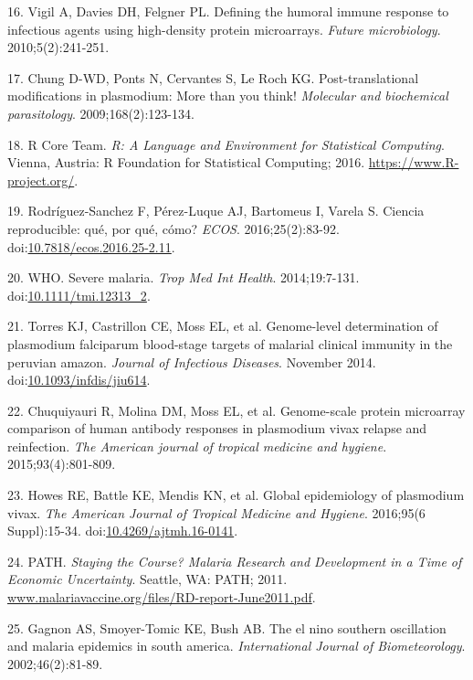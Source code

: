 \documentclass[]{article}
\begin{document}
\hypertarget{ref-vigil2010}{}
16. Vigil A, Davies DH, Felgner PL. Defining the humoral immune response
to infectious agents using high-density protein microarrays.
\emph{Future microbiology}. 2010;5(2):241-251.

\hypertarget{ref-leroch2009postmod}{}
17. Chung D-WD, Ponts N, Cervantes S, Le Roch KG. Post-translational
modifications in plasmodium: More than you think! \emph{Molecular and
biochemical parasitology}. 2009;168(2):123-134.

\hypertarget{ref-R}{}
18. R Core Team. \emph{R: A Language and Environment for Statistical
Computing}. Vienna, Austria: R Foundation for Statistical Computing;
2016. \url{https://www.R-project.org/}.

\hypertarget{ref-CienciaReproducible2016}{}
19. Rodríguez-Sanchez F, Pérez-Luque AJ, Bartomeus I, Varela S. Ciencia
reproducible: qué, por qué, cómo? \emph{ECOS}. 2016;25(2):83-92.
doi:\href{https://doi.org/10.7818/ecos.2016.25-2.11}{10.7818/ecos.2016.25-2.11}.

\hypertarget{ref-WHO2014severe}{}
20. WHO. Severe malaria. \emph{Trop Med Int Health}. 2014;19:7-131.
doi:\href{https://doi.org/10.1111/tmi.12313_2}{10.1111/tmi.12313\_2}.

\hypertarget{ref-Torres2014asymptomatic}{}
21. Torres KJ, Castrillon CE, Moss EL, et al. Genome-level determination
of plasmodium falciparum blood-stage targets of malarial clinical
immunity in the peruvian amazon. \emph{Journal of Infectious Diseases}.
November 2014.
doi:\href{https://doi.org/10.1093/infdis/jiu614}{10.1093/infdis/jiu614}.

\hypertarget{ref-chuquiyauri2015vivax}{}
22. Chuquiyauri R, Molina DM, Moss EL, et al. Genome-scale protein
microarray comparison of human antibody responses in plasmodium vivax
relapse and reinfection. \emph{The American journal of tropical medicine
and hygiene}. 2015;93(4):801-809.

\hypertarget{ref-howes2016global}{}
23. Howes RE, Battle KE, Mendis KN, et al. Global epidemiology of
plasmodium vivax. \emph{The American Journal of Tropical Medicine and
Hygiene}. 2016;95(6 Suppl):15-34.
doi:\href{https://doi.org/10.4269/ajtmh.16-0141}{10.4269/ajtmh.16-0141}.

\hypertarget{ref-path2011}{}
24. PATH. \emph{Staying the Course? Malaria Research and Development in
a Time of Economic Uncertainty}. Seattle, WA: PATH; 2011.
\url{www.malariavaccine.org/files/RD-report-June2011.pdf}.

\hypertarget{ref-gagnon2002enso}{}
25. Gagnon AS, Smoyer-Tomic KE, Bush AB. The el nino southern
oscillation and malaria epidemics in south america. \emph{International
Journal of Biometeorology}. 2002;46(2):81-89.
\end{document}
